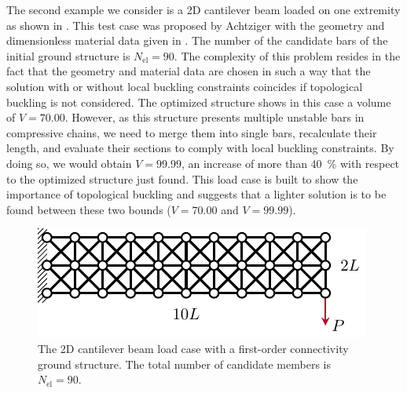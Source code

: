 The second example we consider is a 2D cantilever beam loaded on one extremity as shown in . This test case was proposed by Achtziger  with the geometry and dimensionless material data given in . The number of the candidate bars of the initial ground structure is $N_{\text{el}}=90$. The complexity of this problem resides in the fact that the geometry and material data are chosen in such a way that the solution with or without local buckling constraints coincides if topological buckling is not considered. The optimized structure shows in this case a volume of $V=70.00$. However, as this structure presents multiple unstable bars in compressive chains, we need to merge them into single bars, recalculate their length, and evaluate their sections to comply with local buckling constraints. By doing so, we would obtain $V=99.99$, an increase of more than \qty{40}{\%} with respect to the optimized structure just found. This load case is built to show the importance of topological buckling and suggests that a lighter solution is to be found between these two bounds ($V=70.00$ and $V=99.99$).
\begin{figure}
    \centering
    \includegraphics{figures/04_TTO_improvements/11_Ach_cant/Ach_BC.pdf}
    \caption{The 2D cantilever beam load case with a first-order connectivity ground structure. The total number of candidate members is $N_{\text{el}}=90$.}
    \label{fig:04_2d_cant}
\end{figure}

